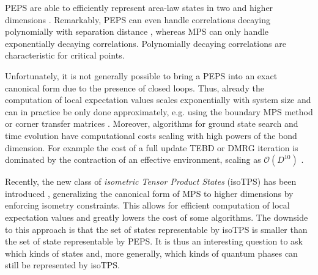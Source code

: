 PEPS are able to efficiently represent area-law states in two and higher dimensions \cite{cite:practical_introduction_MPS_and_PEPS}. Remarkably, PEPS can even handle correlations decaying polynomially with separation distance \cite{cite:criticality_the_area_law_and_the_computational_power_of_PEPS}, whereas MPS can only handle exponentially decaying correlations. Polynomially decaying correlations are characteristic for critical points. \par
Unfortunately, it is not generally possible to bring a PEPS into an exact canonical form due to the presence of closed loops. Thus, already the computation of local expectation values scales exponentially with system size and can in practice be only done approximately, e.g. using the boundary MPS method \cite{cite:practical_introduction_MPS_and_PEPS} or corner transfer matrices \cite{cite:CTMRG}. Moreover, algorithms for ground state search and time evolution have computational costs scaling with high powers of the bond dimension. For example the cost of a full update TEBD or DMRG iteration is dominated by the contraction of an effective environment, scaling as $\mathcal{O}\left(D^{10}\right)$ \cite{cite:unifying_PEPS_contractions}. \par
Recently, the new class of \textit{isometric Tensor Product States} (isoTPS) has been introduced \cite{cite:isometric_tensor_network_states_in_two_dimensions, cite:conversion_of_PEPS_into_a_canonical_form, cite:DMRG_approach_to_optimizing_2D_tensor_networks}, generalizing the canonical form of MPS to higher dimensions by enforcing isometry constraints. This allows for efficient computation of local expectation values and greatly lowers the cost of some algorithms. The downside to this approach is that the set of states representable by isoTPS is smaller than the set of state representable by PEPS. It is thus an interesting question to ask which kinds of states and, more generally, which kinds of quantum phases can still be represented by isoTPS. \par
